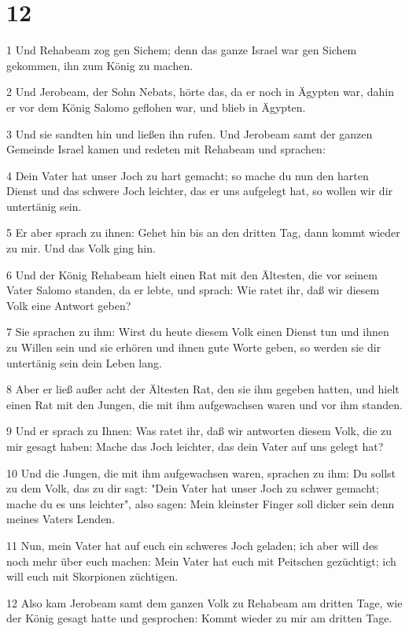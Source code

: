 \chapter{12}

\par 1 Und Rehabeam zog gen Sichem; denn das ganze Israel war gen Sichem gekommen, ihn zum König zu machen.
\par 2 Und Jerobeam, der Sohn Nebats, hörte das, da er noch in Ägypten war, dahin er vor dem König Salomo geflohen war, und blieb in Ägypten.
\par 3 Und sie sandten hin und ließen ihn rufen. Und Jerobeam samt der ganzen Gemeinde Israel kamen und redeten mit Rehabeam und sprachen:
\par 4 Dein Vater hat unser Joch zu hart gemacht; so mache du nun den harten Dienst und das schwere Joch leichter, das er uns aufgelegt hat, so wollen wir dir untertänig sein.
\par 5 Er aber sprach zu ihnen: Gehet hin bis an den dritten Tag, dann kommt wieder zu mir. Und das Volk ging hin.
\par 6 Und der König Rehabeam hielt einen Rat mit den Ältesten, die vor seinem Vater Salomo standen, da er lebte, und sprach: Wie ratet ihr, daß wir diesem Volk eine Antwort geben?
\par 7 Sie sprachen zu ihm: Wirst du heute diesem Volk einen Dienst tun und ihnen zu Willen sein und sie erhören und ihnen gute Worte geben, so werden sie dir untertänig sein dein Leben lang.
\par 8 Aber er ließ außer acht der Ältesten Rat, den sie ihm gegeben hatten, und hielt einen Rat mit den Jungen, die mit ihm aufgewachsen waren und vor ihm standen.
\par 9 Und er sprach zu Ihnen: Was ratet ihr, daß wir antworten diesem Volk, die zu mir gesagt haben: Mache das Joch leichter, das dein Vater auf uns gelegt hat?
\par 10 Und die Jungen, die mit ihm aufgewachsen waren, sprachen zu ihm: Du sollst zu dem Volk, das zu dir sagt: "Dein Vater hat unser Joch zu schwer gemacht; mache du es uns leichter", also sagen: Mein kleinster Finger soll dicker sein denn meines Vaters Lenden.
\par 11 Nun, mein Vater hat auf euch ein schweres Joch geladen; ich aber will des noch mehr über euch machen: Mein Vater hat euch mit Peitschen gezüchtigt; ich will euch mit Skorpionen züchtigen.
\par 12 Also kam Jerobeam samt dem ganzen Volk zu Rehabeam am dritten Tage, wie der König gesagt hatte und gesprochen: Kommt wieder zu mir am dritten Tage.
